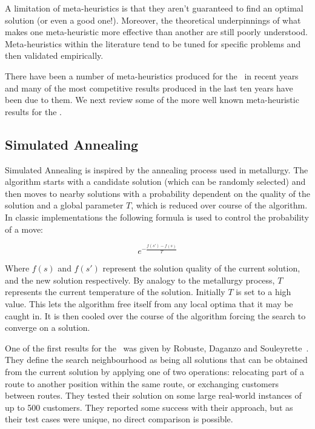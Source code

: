 
A limitation of meta-heuristics is that they aren't guaranteed to find an optimal solution (or even a good one!). Moreover, the theoretical underpinnings of what makes one meta-heuristic more effective than another are still poorly understood. Meta-heuristics within the literature tend to be tuned for specific problems and then validated empirically.

There have been a number of meta-heuristics produced for the \VRP\ in recent years and many of the most competitive results produced in the last ten years have been due to them. We next review some of the more well known meta-heuristic results for the \VRP.

\subsection{Simulated Annealing}

Simulated Annealing is inspired by the annealing process used in metallurgy. The algorithm starts with a candidate solution (which can be randomly selected) and then moves to nearby solutions with a probability dependent on the quality of the solution and a global parameter $T$, which is reduced over course of the algorithm. In classic implementations the following formula is used to control the probability of a move: 

\[
e^{-\frac{f(s')-f(s)}{T}}
\]

Where $f(s)$ and $f(s')$ represent the solution quality of the current solution, and the new solution respectively. By analogy to the metallurgy process, $T$ represents the current temperature of the solution. Initially $T$ is set to a high value. This lets the algorithm free itself from any local optima that it may be caught in. It is then cooled over the course of the algorithm forcing the search to converge on a solution. 

One of the first results for the \VRP\ was given by Robuste, Daganzo and Souleyrette~\cite{RDS:1990}. They define the search neighbourhood as being all solutions that can be obtained from the current solution by applying one of two operations: relocating part of a route to another position within the same route, or exchanging customers between routes. They tested their solution on some large real-world instances of up to 500 customers. They reported some success with their approach, but as their test cases were unique, no direct comparison is possible. 

